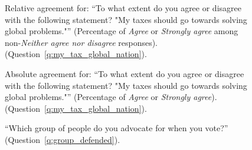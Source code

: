 \begin{figure}[h!]
    \caption[Relative agreement: ``My taxes should go towards solving global problems'']{Relative agreement for: ``To what extent do you agree or disagree with the following statement? "My taxes should go towards solving global problems."'' (Percentage of \textit{Agree} or \textit{Strongly agree} among non-\textit{Neither agree nor disagree} responses). (Question~\ref{q:my_tax_global_nation}).
    }\label{fig:my_tax_global_nation_share}
\end{figure}

\begin{figure}[h!]
    \caption[Absolute agreement: ``My taxes should go towards solving global problems'']{Absolute agreement for: ``To what extent do you agree or disagree with the following statement? "My taxes should go towards solving global problems."'' (Percentage of \textit{Agree} or \textit{Strongly agree}). (Question~\ref{q:my_tax_global_nation}).
    }\label{fig:my_tax_global_nation_positive}
\end{figure}

\begin{figure}[h!]
    \caption[Moral circle]{``Which group of people do you advocate for when you vote?'' (Question~\ref{q:group_defended}).
    }\label{fig:group_defended_all}
\end{figure}


